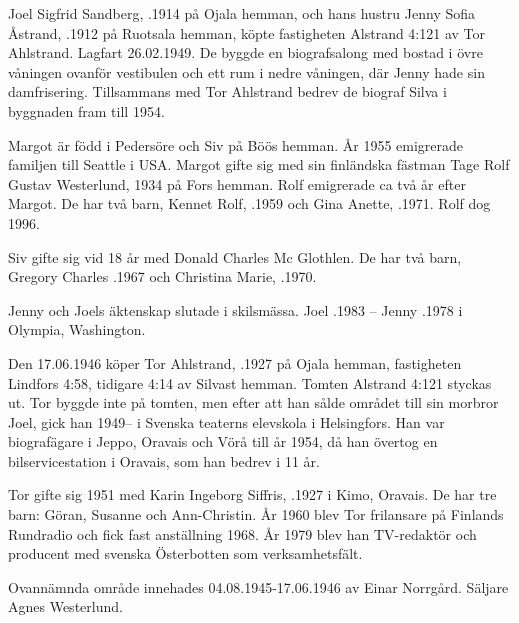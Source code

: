 Joel Sigfrid Sandberg, .1914 på Ojala hemman, och hans hustru Jenny Sofia Åstrand, .1912 på	Ruotsala hemman, köpte fastigheten Alstrand 4:121 av Tor Ahlstrand. Lagfart 26.02.1949. De byggde en biografsalong med bostad i övre våningen ovanför vestibulen och ett rum	i nedre våningen, där Jenny hade sin damfrisering. Tillsammans med Tor Ahlstrand bedrev de biograf Silva i byggnaden fram till 1954.
\begin{jhchildren}
  \item {}
  \item {}
\end{jhchildren}
Margot är född i Pedersöre och Siv på Böös hemman. År 1955 emigrerade familjen till Seattle i USA. Margot gifte sig	med sin finländska fästman Tage Rolf Gustav Westerlund,  1934 på Fors hemman. Rolf emigrerade ca två år  		efter Margot. De har två barn, Kennet Rolf, .1959 och Gina Anette, .1971. Rolf dog 1996.

Siv gifte sig vid 18 år med Donald Charles Mc Glothlen. De har två barn, Gregory Charles .1967 och 		Christina Marie, .1970.

Jenny och Joels äktenskap slutade i skilsmässa.	Joel .1983  --  Jenny .1978 i Olympia,		Washington.


Den 17.06.1946 köper Tor Ahlstrand, .1927 på Ojala hemman, fastigheten Lindfors 4:58, tidigare 4:14 av 		Silvast hemman. Tomten Alstrand 4:121 styckas ut.	Tor byggde inte på tomten, men efter att han sålde området till sin morbror Joel, gick han 1949-- i Svenska teaterns elevskola i Helsingfors. Han var biografägare i Jeppo, Oravais och Vörå till år 1954, då han övertog en bilservicestation i Oravais, som han bedrev i 11 år.

Tor gifte sig 1951 med Karin Ingeborg Siffris, .1927 i Kimo, Oravais. De har tre barn: Göran, Susanne och Ann-Christin.	År 1960 blev Tor frilansare på Finlands Rundradio och fick fast anställning 1968. År 1979 blev han TV-redaktör och producent med svenska Österbotten som verksamhetsfält.


Ovannämnda område innehades 04.08.1945-17.06.1946	av Einar Norrgård. Säljare Agnes Westerlund.


